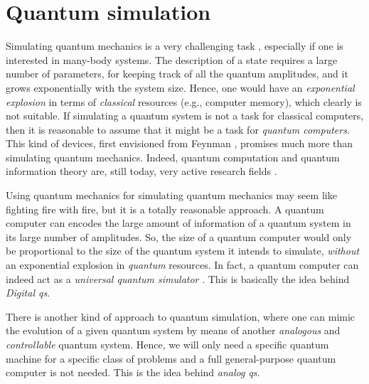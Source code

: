 \section{Quantum simulation}
\label{sec:quantum_simulation}

Simulating quantum mechanics is a very challenging task \cite{manin1980computable, feynman1982simulation}, especially if one is interested in many-body systems.
The description of a state requires a large number of parameters, for keeping track of all the quantum amplitudes, and it grows exponentially with the system size.
Hence, one would have an \emph{exponential explosion} in terms of \emph{classical} resources (e.g., computer memory), which clearly is not suitable.
If simulating a quantum system is not a task for classical computers, then it is reasonable to assume that it might be a task for \emph{quantum computers}.
This kind of devices, first envisioned from Feynman \cite{feynman1982simulation}, promises much more than simulating quantum mechanics.
Indeed, quantum computation and quantum information theory are, still today, very active research fields \cite{nielsen2010quantum, schleich2007elements, stolze2008quantum}.

Using quantum mechanics for simulating quantum mechanics may seem like fighting fire with fire, but it is a totally reasonable approach.
A quantum computer can encodes the large amount of information of a quantum system in its large number of amplitudes.
So, the size of a quantum computer would only be proportional to the size of the quantum system it intends to simulate, \emph{without} an exponential explosion in \emph{quantum} resources.
In fact, a quantum computer can indeed act as a \emph{universal quantum simulator} \cite{lloyd1996simulator}.
This is basically the idea behind \emph{Digital \acl{qs}}.

There is another kind of approach to quantum simulation, where one can mimic the evolution of a given quantum system by means of another \emph{analogous} and \emph{controllable} quantum system.
Hence, we will only need a specific quantum machine for a specific class of problems and a full general-purpose quantum computer is not needed.
This is the idea behind \emph{analog \acl{qs}}.

